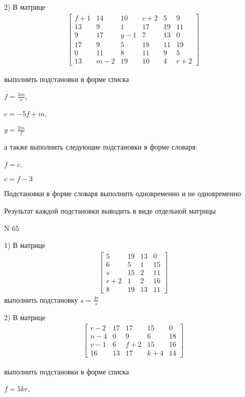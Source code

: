 \documentclass[11pt]{report}
\begin{document}
    2) В матрице
\begin{align*}
\left[\begin{matrix}f + 1 & 14 & 10 & c + 2 & 5 & 9\\13 & 9 & 1 & 17 & 19 & 11\\9 & 17 & y - 1 & 7 & 13 & 0\\17 & 9 & 5 & 18 & 11 & 19\\0 & 11 & 8 & 11 & 9 & 5\\13 & m - 2 & 19 & 10 & 4 & r + 2\end{matrix}\right]
\end{align*}

выполнить подстановки в форме списка

$f=\frac{3 m}{c}$,

$c=- 5 f + m$,

$y=\frac{2 m}{f}$

а также выполнить следующие подстановки в форме словаря:

$f=c$,

$c=f - 3$


    Подстановки в форме словаря выполнить одновременно и не одновременно


    Результат каждой подстановки выводить в виде отдельной матрицы

\newpage
N 65


    1) В матрице
\begin{align*}
\left[\begin{matrix}5 & 19 & 13 & 0\\6 & 5 & 1 & 15\\s & 15 & 2 & 11\\r + 2 & 1 & 2 & 16\\8 & 19 & 13 & 11\end{matrix}\right]
\end{align*}
выполнить подстановку $s=\frac{4 r}{s}$


    2) В матрице
\begin{align*}
\left[\begin{matrix}r - 2 & 17 & 17 & 15 & 0\\n - 4 & 0 & 9 & 6 & 18\\v - 1 & 6 & f + 2 & 15 & 16\\16 & 13 & 17 & k + 4 & 14\end{matrix}\right]
\end{align*}

выполнить подстановки в форме списка

$f=5 k r$,
\end{document}
